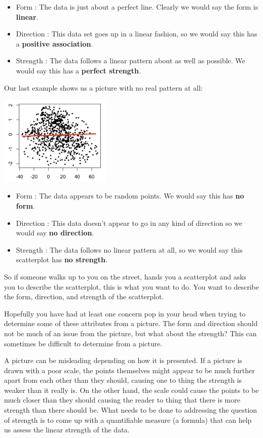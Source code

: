 \documentclass[
  letterpaper,
  DIV=11,
  numbers=noendperiod]{scrreprt}
\providecommand{\tightlist}{%
  \setlength{\itemsep}{0pt}\setlength{\parskip}{0pt}}\usepackage{longtable,booktabs,array}
\begin{document}
\begin{itemize}
\tightlist
\item
  Form : The data is just about a perfect line. Clearly we would say the
  form is \textbf{linear}.
\item
  Direction : This data set goes up in a linear fashion, so we would say
  this has a \textbf{positive association}.
\item
  Strength : The data follows a linear pattern about as well as
  possible. We would say this has a \textbf{perfect strength}.
\end{itemize}

Our last example shows us a picture with no real pattern at all:

\includegraphics[width=0.4\textwidth,height=\textheight]{./images/SC_6.jpg}

\begin{itemize}
\tightlist
\item
  Form : The data appears to be random points. We would say this has
  \textbf{no form}.
\item
  Direction : This data doesn't appear to go in any kind of direction so
  we would say \textbf{no direction}.
\item
  Strength : The data follows no linear pattern at all, so we would say
  this scatterplot has \textbf{no strength}.
\end{itemize}

So if someone walks up to you on the street, hands you a scatterplot and
asks you to describe the scatterplot, this is what you want to do. You
want to describe the form, direction, and strength of the scatterplot.

Hopefully you have had at least one concern pop in your head when trying
to determine some of these attributes from a picture. The form and
direction should not be much of an issue from the picture, but what
about the strength? This can sometimes be difficult to determine from a
picture.

A picture can be misleading depending on how it is presented. If a
picture is drawn with a poor scale, the points themselves might appear
to be much further apart from each other than they should, causing one
to thing the strength is weaker than it really is. On the other hand,
the scale could cause the points to be much closer than they should
causing the reader to thing that there is more strength than there
should be. What needs to be done to addressing the question of strength
is to come up with a quantifiable measure (a formula) that can help us
assess the linear strength of the data.
\end{document}
